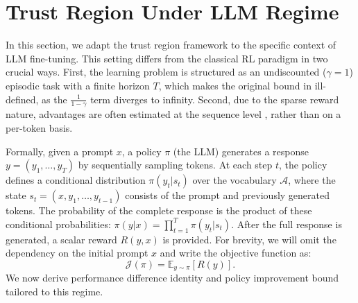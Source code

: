 
\section{Trust Region Under LLM Regime}
\label{sec:llm_tr}  

In this section, we adapt the trust region framework to the specific context of LLM fine-tuning. This setting differs from the classical RL paradigm in two crucial ways. First, the learning problem is structured as an undiscounted ($\gamma=1$) episodic task with a finite horizon $T$, which makes the original bound in  ill-defined, as the $\frac{1}{1-\gamma}$ term diverges to infinity. Second, due to the sparse reward nature, advantages are often estimated at the sequence level \citep{shao2024deepseekmath}, rather than on a per-token basis.

Formally, given a prompt $x$, a policy $\pi$ (the LLM) generates a response $y=(y_1, \dots, y_T)$ by sequentially sampling tokens. At each step $t$, the policy defines a conditional distribution $\pi(y_t|s_t)$ over the vocabulary $\mathcal{A}$, where the state $s_t = (x, y_1, \dots, y_{t-1})$ consists of the prompt and previously generated tokens. The probability of the complete response is the product of these conditional probabilities:  
$
\pi(y|x) = \prod_{t=1}^{T} \pi(y_t | s_t).  
$
After the full response is generated, a scalar reward $R(y, x)$ is provided. For brevity, we will omit the dependency on the initial prompt $x$ and write the objective function as: 
$$  
\mathcal{J}(\pi) = \mathbb{E}_{y \sim \pi}[R(y)].  
$$  
We now derive performance difference identity and policy improvement bound tailored to this regime.  


